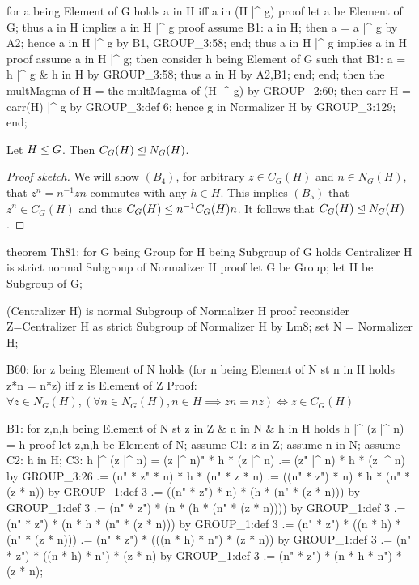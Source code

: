   for a being Element of G holds a in H iff a in (H |^ g)
  proof
    let a be Element of G;
    thus a in H implies a in H |^ g
    proof
      assume B1: a in H;
      then a = a |^ g by A2;
      hence a in H |^ g by B1, GROUP_3:58;
    end;
    thus a in H |^ g implies a in H
    proof
      assume a in H |^ g;
      then consider h being Element of G such that
      B1: a = h |^ g & h in H
      by GROUP_3:58;
      thus a in H by A2,B1;
    end;
  end;
  then the multMagma of H = the multMagma of (H |^ g) by GROUP_2:60;
  then carr H = carr(H) |^ g by GROUP_3:def 6;
  hence g in Normalizer H by GROUP_3:129;
end;
\nwendcode{}\nwdocspar

\begin{theorem}
Let $H\leq G$. Then $C_{G}(H)\trianglelefteq N_{G}(H)$.
\end{theorem}

\begin{proof}[Proof sketch]
We will show $(B_{4})$, for arbitrary $z\in C_{G}(H)$ and $n\in N_{G}(H)$, that
$z^{n}=n^{-1}zn$ commutes with any $h\in H$. This implies $(B_{5})$ that
$z^{n}\in C_{G}(H)$ and thus $C_{G}(H)\leq n^{-1}C_{G}(H)n$. It
follows that $C_{G}(H)\trianglelefteq N_{G}(H)$.
\end{proof}

\nwenddocs{}\endmoddef\nwstartdeflinemarkup{}\nwenddeflinemarkup
theorem Th81:
  for G being Group
  for H being Subgroup of G
  holds Centralizer H is strict normal Subgroup of Normalizer H
proof
  let G be Group;
  let H be Subgroup of G;

  (Centralizer H) is normal Subgroup of Normalizer H
  proof
    reconsider Z=Centralizer H as strict Subgroup of Normalizer H by Lm8;
    set N = Normalizer H;

    B60: for z being Element of N
    holds (for n being Element of N st n in H holds z*n = n*z) iff
          z is Element of Z
    \LA{}Proof: $\forall z\in N_{G}(H), (\forall n\in N_{G}(H), n\in H\implies zn=nz)\iff z\in C_{G}(H)$~{\nwtagstyle{}}\RA{}


    B1: for z,n,h being Element of N
    st z in Z & n in N & h in H
    holds h |^ (z |^ n) = h
    proof
      let z,n,h be Element of N;
      assume C1: z in Z;
      assume n in N;
      assume C2: h in H;
      C3: h |^ (z |^ n) = (z |^ n)" * h * (z |^ n)
      .= (z" |^ n) * h * (z |^ n) by GROUP_3:26
      .= (n" * z" * n) * h * (n" * z * n)
      .= ((n" * z") * n) * h * (n" * (z * n)) by GROUP_1:def 3
      .= ((n" * z") * n) * (h * (n" * (z * n))) by GROUP_1:def 3
      .= (n" * z") * (n * (h * (n" * (z * n)))) by GROUP_1:def 3
      .= (n" * z") * (n * h * (n" * (z * n))) by GROUP_1:def 3
      .= (n" * z") * ((n * h) * (n" * (z * n)))
      .= (n" * z") * (((n * h) * n") * (z * n)) by GROUP_1:def 3
      .= (n" * z") * ((n * h) * n") * (z * n) by GROUP_1:def 3
      .= (n" * z") * (n * h * n") * (z * n);

